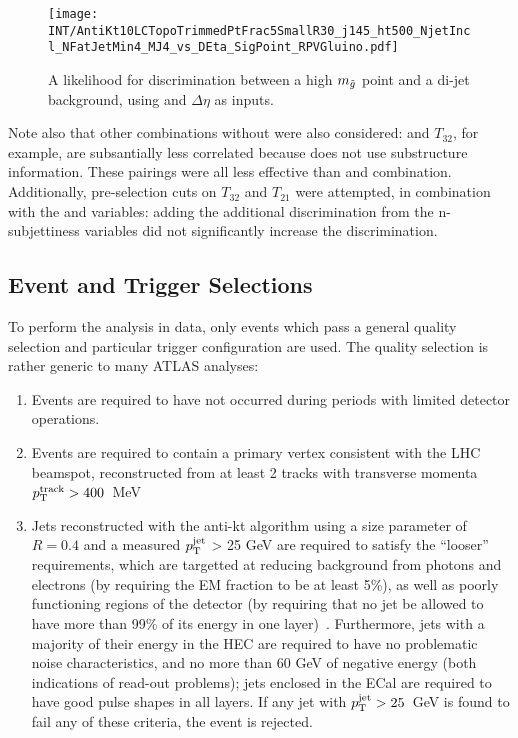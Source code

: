 

\begin{figure}
\centering
\texttt{[image: INT/AntiKt10LCTopoTrimmedPtFrac5SmallR30\_j145\_ht500\_NjetIncl\_NFatJetMin4\_MJ4\_vs\_DEta\_SigPoint\_RPVGluino.pdf]}
\label{fig:search:search:optimization:2D:DETAraw}
\caption{A likelihood for discrimination between a high $m_{\tilde{g}}$ point and a \herwigpp di-jet background, using \MJ and $\Delta \eta$ as inputs.}
\end{figure}



Note also that other combinations without \MJ were also considered: \Ht and $T_{32}$, for example, are subsantially less correlated because \Ht does not use substructure information. These pairings were all less effective than \MJ and \Deta combination. Additionally, pre-selection cuts on $T_{32}$ and $T_{21}$ were attempted, in combination with the \MJ and \Deta variables: adding the additional discrimination from the n-subjettiness variables did not significantly increase the discrimination.


\subsection{Event and Trigger Selections}

To perform the analysis in data, only events which pass a general quality selection and particular trigger configuration are used. The quality selection is rather generic to many ATLAS analyses:
%
\begin{enumerate}
\item Events are required to have not occurred during periods with limited detector operations.
\item Events are required to contain a primary vertex consistent with the LHC beamspot, reconstructed from at least 2 tracks with transverse momenta $p_{\text{T}}^{\mathrm{track}} > 400$~MeV
\item Jets reconstructed with the anti-kt algorithm using a size parameter of $R = 0.4$ and a measured $p_{\text{T}}^{\mathrm{jet}}$ > 25 GeV are required to satisfy the “looser” requirements, which are targetted at reducing background from photons and electrons (by requiring the EM fraction to be at least 5\%), as well as poorly functioning regions of the detector (by requiring that no jet be allowed to have more than 99\% of its energy in one layer)~\cite{jetquality}. Furthermore, jets with a majority of their energy in the HEC are required to have no problematic noise characteristics, and no more than 60 GeV of negative energy (both indications of read-out problems); jets enclosed in the ECal are required to have good pulse shapes in all layers. If any jet with $p_{\text{T}}^{\mathrm{jet}} > 25$~GeV is found to fail any of these criteria, the event is rejected.
\end{enumerate} 
%

